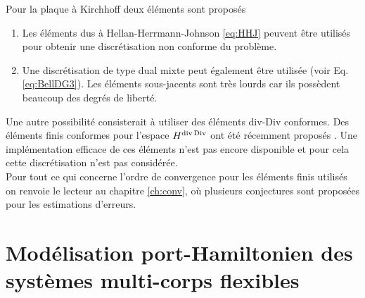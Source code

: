 Pour la plaque à Kirchhoff deux éléments sont proposés
\begin{enumerate}
	\item Les éléments dus à Hellan-Herrmann-Johnson \eqref{eq:HHJ} \cite{hellan1967,herrmann1967finite,johnson1973convergence} peuvent être utilisés pour obtenir une discrétisation non conforme du problème.
	\item Une discrétisation de type dual mixte peut également être utilisée (voir Eq. \eqref{eq:BellDG3}). Les éléments sous-jacents sont très lourds car ils possèdent beaucoup des degrés de liberté.
\end{enumerate}

Une autre possibilité consisterait à utiliser des éléments div-Div conformes. Des éléments finis conformes pour l'espace $ H^{\operatorname{div}\operatorname*{Div}} $ ont été récemment proposés \cite{chen2020divDiv}. Une implémentation efficace de ces éléments n'est pas encore disponible et pour cela cette discrétisation n'est pas considérée. \\

Pour tout ce qui  concerne l'ordre de convergence pour les éléments finis utilisés on renvoie le lecteur au chapitre \ref{ch:conv}, où plusieurs conjectures sont proposées pour les estimations d'erreurs.


\section{Modélisation port-Hamiltonien des systèmes multi-corps flexibles}

